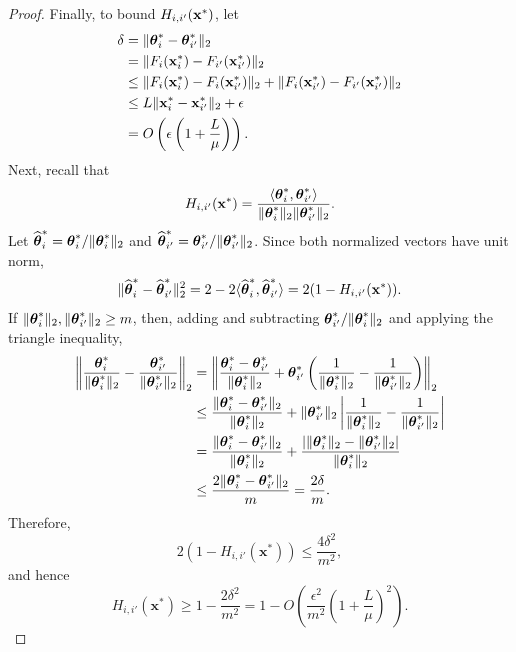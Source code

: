 \begin{proof}
Finally, to bound $H_{i,i'}(\mathbf{x}^*)$, let 
\[
\begin{aligned}
\delta
&=
\lVert\boldsymbol{\theta}_i^*-\boldsymbol{\theta}_{i'}^*\rVert_2\\
&=
\lVert F_i(\mathbf{x}_i^*)-F_{i'}(\mathbf{x}_{i'}^*)\rVert_2\\
&\leq
\lVert F_i(\mathbf{x}_i^*)-F_i(\mathbf{x}_{i'}^*)\rVert_2
+
\lVert F_i(\mathbf{x}_{i'}^*)-F_{i'}(\mathbf{x}_{i'}^*)\rVert_2\\
&\leq
L\lVert\mathbf{x}_i^*-\mathbf{x}_{i'}^*\rVert_2+\epsilon\\
&=
O\left(\epsilon\left(1+\frac{L}{\mu}\right)\right).
\end{aligned}
\]
Next, recall that
\[
H_{i,i'}(\mathbf{x}^*)=\frac{\langle\boldsymbol{\theta}_i^*,\boldsymbol{\theta}_{i'}^*\rangle}{\lVert\boldsymbol{\theta}_i^*\rVert_2\lVert\boldsymbol{\theta}_{i'}^*\rVert_2}.
\]
Let $\widehat{\boldsymbol{\theta}}_i^*=\boldsymbol{\theta}_i^*/\lVert\boldsymbol{\theta}_i^*\rVert_2$ and $\widehat{\boldsymbol{\theta}}_{i'}^*=\boldsymbol{\theta}_{i'}^*/\lVert\boldsymbol{\theta}_{i'}^*\rVert_2$. Since both normalized vectors have unit norm,
\[
\lVert\widehat{\boldsymbol{\theta}}_i^*-\widehat{\boldsymbol{\theta}}_{i'}^*\rVert_2^2
=2-2\langle\widehat{\boldsymbol{\theta}}_i^*,\widehat{\boldsymbol{\theta}}_{i'}^*\rangle
=2(1-H_{i,i'}(\mathbf{x}^*)).
\]
If $\lVert\boldsymbol{\theta}_i^*\rVert_2,\lVert\boldsymbol{\theta}_{i'}^*\rVert_2\geq m$, then, adding and subtracting $\boldsymbol{\theta}_{i'}^*/\lVert\boldsymbol{\theta}_i^*\rVert_2$ and applying the triangle inequality,
\[
\begin{aligned}
\left\lVert\frac{\boldsymbol{\theta}_i^*}{\lVert\boldsymbol{\theta}_i^*\rVert_2}-\frac{\boldsymbol{\theta}_{i'}^*}{\lVert\boldsymbol{\theta}_{i'}^*\rVert_2}\right\rVert_2
&=
\left\lVert
\frac{\boldsymbol{\theta}_i^*-\boldsymbol{\theta}_{i'}^*}{\lVert\boldsymbol{\theta}_i^*\rVert_2}
+
\boldsymbol{\theta}_{i'}^*
\left(
\frac{1}{\lVert\boldsymbol{\theta}_i^*\rVert_2}
-
\frac{1}{\lVert\boldsymbol{\theta}_{i'}^*\rVert_2}
\right)
\right\rVert_2 \\
&\leq
\frac{\lVert\boldsymbol{\theta}_i^*-\boldsymbol{\theta}_{i'}^*\rVert_2}{\lVert\boldsymbol{\theta}_i^*\rVert_2}
+
\lVert\boldsymbol{\theta}_{i'}^*\rVert_2
\left|
\frac{1}{\lVert\boldsymbol{\theta}_i^*\rVert_2}
-
\frac{1}{\lVert\boldsymbol{\theta}_{i'}^*\rVert_2}
\right| \\
&=
\frac{\lVert\boldsymbol{\theta}_i^*-\boldsymbol{\theta}_{i'}^*\rVert_2}{\lVert\boldsymbol{\theta}_i^*\rVert_2}
+
\frac{\left|\lVert\boldsymbol{\theta}_i^*\rVert_2-\lVert\boldsymbol{\theta}_{i'}^*\rVert_2\right|}{\lVert\boldsymbol{\theta}_i^*\rVert_2} \\
&\leq
\frac{2\lVert\boldsymbol{\theta}_i^*-\boldsymbol{\theta}_{i'}^*\rVert_2}{m}
=
\frac{2\delta}{m}.
\end{aligned}
\]
Therefore,
\[
2(1-H_{i,i'}(\mathbf{x}^*))\leq\frac{4\delta^2}{m^2},
\]
and hence
\[
H_{i,i'}(\mathbf{x}^*)\geq1-\frac{2\delta^2}{m^2}=1-O\left(\frac{\epsilon^2}{m^2}\left(1+\frac{L}{\mu}\right)^2\right).
\]
\end{proof}

